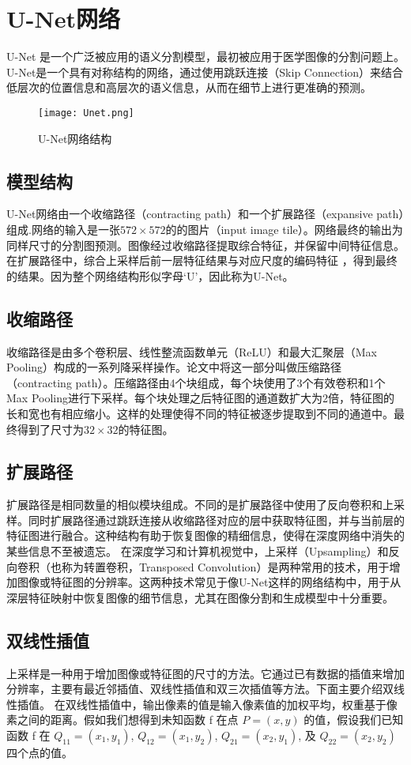 \section{U-Net网络}
U-Net
\cite{ronnebergerUNetConvolutionalNetworks2015}是一个广泛被应用的语义分割模型，最初被应用于医学图像的分割问题上。U-Net是一个具有对称结构的网络，通过使用跳跃连接（Skip Connection）来结合低层次的位置信息和高层次的语义信息，从而在细节上进行更准确的预测。
\begin{figure}[h]
  \centering
  \texttt{[image: Unet.png]}
  \caption{U-Net网络结构}
  \label{fig:UNet}
\end{figure}
\subsection{模型结构}
U-Net网络由一个收缩路径（contracting path）和一个扩展路径（expansive path）组成.网络的输入是一张$572\times 572$的的图片（input image tile）。网络最终的输出为同样尺寸的分割图预测。图像经过收缩路径提取综合特征，并保留中间特征信息。在扩展路径中，综合上采样后前一层特征结果与对应尺度的编码特征 ，得到最终的结果。因为整个网络结构形似字母‘U’，因此称为U-Net。
\subsection{收缩路径}
收缩路径是由多个卷积层、线性整流函数单元（ReLU）和最大汇聚层（Max Pooling）构成的一系列降采样操作。论文中将这一部分叫做压缩路径（contracting path）。压缩路径由4个块组成，每个块使用了3个有效卷积和1个Max Pooling进行下采样。每个块处理之后特征图的通道数扩大为2倍，特征图的长和宽也有相应缩小。这样的处理使得不同的特征被逐步提取到不同的通道中。最终得到了尺寸为$32\times 32$的特征图。
\subsection{扩展路径}
扩展路径是相同数量的相似模块组成。不同的是扩展路径中使用了反向卷积和上采样。同时扩展路径通过跳跃连接从收缩路径对应的层中获取特征图，并与当前层的特征图进行融合。这种结构有助于恢复图像的精细信息，使得在深度网络中消失的某些信息不至被遗忘。
在深度学习和计算机视觉中，上采样（Upsampling）和反向卷积（也称为转置卷积，Transposed Convolution）是两种常用的技术，用于增加图像或特征图的分辨率。这两种技术常见于像U-Net这样的网络结构中，用于从深层特征映射中恢复图像的细节信息，尤其在图像分割和生成模型中十分重要。

\subsection{双线性插值}
上采样是一种用于增加图像或特征图的尺寸的方法。它通过已有数据的插值来增加分辨率，主要有最近邻插值、双线性插值和双三次插值等方法。下面主要介绍双线性插值\cite{2022Upsamplingcomparativestudynewideas}。
在双线性插值中，输出像素的值是输入像素值的加权平均，权重基于像素之间的距离。假如我们想得到未知函数 f 在点 $P=\left( x, y\right)$ 的值，假设我们已知函数 f 在 $Q_{11} = \left( x_1, y_1 \right) $, $Q_{12} = \left( x_1, y_2 \right) $, $Q_{21} = \left( x_2, y_1 \right) $, 及 $Q_{22} = \left( x_2, y_2 \right) $ 四个点的值。 

